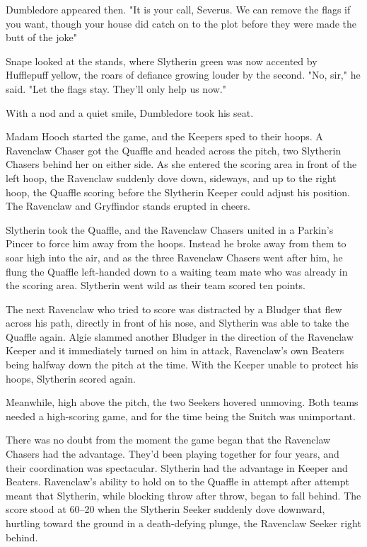 Dumbledore appeared then. "It is your call, Severus. We can remove the flags if you want, though your house did catch on to the plot before they were made the butt of the joke{\el}"

Snape looked at the stands, where Slytherin green was now accented by Hufflepuff yellow, the roars of defiance growing louder by the second. "No, sir," he said. "Let the flags stay. They'll only help us now."

With a nod and a quiet smile, Dumbledore took his seat.

Madam Hooch started the game, and the Keepers sped to their hoops. A Ravenclaw Chaser got the Quaffle and headed across the pitch, two Slytherin Chasers behind her on either side. As she entered the scoring area in front of the left hoop, the Ravenclaw suddenly dove down, sideways, and up to the right hoop, the Quaffle scoring before the Slytherin Keeper could adjust his position. The Ravenclaw and Gryffindor stands erupted in cheers.

Slytherin took the Quaffle, and the Ravenclaw Chasers united in a Parkin's Pincer to force him away from the hoops. Instead he broke away from them to soar high into the air, and as the three Ravenclaw Chasers went after him, he flung the Quaffle left-handed down to a waiting team mate who was already in the scoring area. Slytherin went wild as their team scored ten points.

The next Ravenclaw who tried to score was distracted by a Bludger that flew across his path, directly in front of his nose, and Slytherin was able to take the Quaffle again. Algie slammed another Bludger in the direction of the Ravenclaw Keeper and it immediately turned on him in attack, Ravenclaw's own Beaters being halfway down the pitch at the time. With the Keeper unable to protect his hoops, Slytherin scored again.

Meanwhile, high above the pitch, the two Seekers hovered unmoving. Both teams needed a high-scoring game, and for the time being the Snitch was unimportant.

There was no doubt from the moment the game began that the Ravenclaw Chasers had the advantage. They'd been playing together for four years, and their coordination was spectacular. Slytherin had the advantage in Keeper and Beaters. Ravenclaw's ability to hold on to the Quaffle in attempt after attempt meant that Slytherin, while blocking throw after throw, began to fall behind. The score stood at 60--20 when the Slytherin Seeker suddenly dove downward, hurtling toward the ground in a death-defying plunge, the Ravenclaw Seeker right behind.

